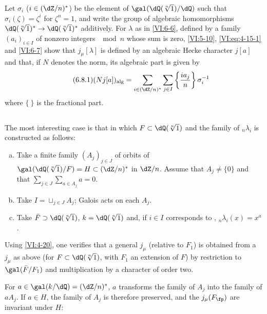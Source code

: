 Let $\sigma_i$ ($i\in (\dZ/n)^\ast$) be the element of 
$\gal(\dQ(\sqrt[n]{1})/\dQ)$ such that $\sigma_i(\zeta)=\zeta^i$ for $\zeta^n=1$, 
and write the group of algebraic homomorphisms 
$\dQ(\sqrt[n]{1})^\ast \to \dQ(\sqrt[n]{1})^\ast$ additively. For $\lambda$ as in 
\ref{VI:6-6}, defined by a family 
$(a_i)_{i\in I}$ of nonzero integers $\mod n$ whose sum is zero, 
\ref{VI:5-10}, \eqref{VI:eq:4-15-1} and \ref{VI:6-7} 
show that $j_\mu[\lambda]$ is defined by an algebraic Hecke character 
$j[a]$ and that, if $N$ denotes the norm, its algebraic part is 
given by 
\begin{equation*}\tag{6.8.1}\label{VI:eq:6-8-1}
  (N j[a])_\text{alg} = \sum_{i\in (\dZ/n)^\ast} \sum_{j\in I} \left\{ \frac{i a_j}{n} \right\} \sigma_i^{-1} 
\end{equation*}
  where $\{\ \}$ is the fractional part. 





\subsection{}\label{VI:6-9}

The most interesting case is that in which $F\subset \dQ(\sqrt[n]{1})$ and 
the family of $_n \lambda_i$ is constructed as follows: 
\begin{enumerate}[a)]
  \item Take a finite family $(A_j)_{j\in J}$ of orbits of 
    $\gal(\dQ(\sqrt[n]{1})/F)=H\subset (\dZ/n)^\ast$ in $\dZ/n$. Assume that 
    $A_j\ne\{0\}$ and that $\sum_{j\in J} \sum_{a\in A_j} a=0$. 
\item Take $I=\sqcup_{j\in J} A_j$; Galois acts on each $A_j$. 
  \item Take $\bar F\supset \dQ(\sqrt[n]{1})$, $k=\dQ(\sqrt[n]{1})$ and, if 
    $i\in I$ corresponds to , 
    $_n\lambda_i(x)=x^a$. 
\end{enumerate}

Using \ref{VI:4-20}, one verifies that a general $j_\mu$ (relative to 
$F_1$) is obtained from a $j_\mu$ as above (for 
$F\subset \dQ(\sqrt[n]{1})$, with $F_1$ an extension of $F$) by restriction to 
$\gal(\bar F/F_1)$ and multiplication by a character of order two. 

For $a\in \gal(k/\dQ)=(\dZ/n)^\ast$, $a$ transforms the family of $A_j$ 
into the family of $a A_j$. If $a\in H$, the family of $A_j$ is therefore preserved, 
and the $j_\mu(F_\fp)$ are invariant under $H$: 






